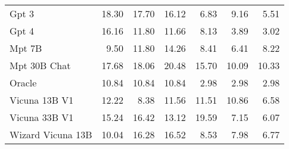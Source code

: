 \begin{table}[!htbp]
\begin{tabular}{l|rrr|rrr}
Gpt 3 & {\cellcolor[HTML]{91017A}} \color[HTML]{F1F1F1} 18.30 & {\cellcolor[HTML]{A5017D}} \color[HTML]{F1F1F1} 17.70 & {\cellcolor[HTML]{D82E94}} \color[HTML]{F1F1F1} 16.12 & {\cellcolor[HTML]{D0EDE9}} \color[HTML]{000000} 6.83 & {\cellcolor[HTML]{9AD8CA}} \color[HTML]{000000} 9.16 & {\cellcolor[HTML]{E0F3F5}} \color[HTML]{000000} 5.51 \\
Gpt 4 & {\cellcolor[HTML]{D62D93}} \color[HTML]{F1F1F1} 16.16 & {\cellcolor[HTML]{FBBBBD}} \color[HTML]{000000} 11.80 & {\cellcolor[HTML]{FCBFBE}} \color[HTML]{000000} 11.66 & {\cellcolor[HTML]{B4E2D8}} \color[HTML]{000000} 8.13 & {\cellcolor[HTML]{EFF9FB}} \color[HTML]{000000} 3.89 & {\cellcolor[HTML]{F7FCFD}} \color[HTML]{000000} 3.02 \\
Mpt 7B & {\cellcolor[HTML]{FEE6E3}} \color[HTML]{000000} 9.50 & {\cellcolor[HTML]{FBBBBD}} \color[HTML]{000000} 11.80 & {\cellcolor[HTML]{F76EA3}} \color[HTML]{F1F1F1} 14.26 & {\cellcolor[HTML]{ADE0D4}} \color[HTML]{000000} 8.41 & {\cellcolor[HTML]{D5EFED}} \color[HTML]{000000} 6.41 & {\cellcolor[HTML]{B2E2D7}} \color[HTML]{000000} 8.22 \\
Mpt 30B Chat & {\cellcolor[HTML]{A6017D}} \color[HTML]{F1F1F1} 17.68 & {\cellcolor[HTML]{99017B}} \color[HTML]{F1F1F1} 18.06 & {\cellcolor[HTML]{49006A}} \color[HTML]{F1F1F1} 20.48 & {\cellcolor[HTML]{1F8742}} \color[HTML]{F1F1F1} 15.70 & {\cellcolor[HTML]{84CFB9}} \color[HTML]{000000} 10.09 & {\cellcolor[HTML]{7DCCB5}} \color[HTML]{000000} 10.33 \\
Oracle & {\cellcolor[HTML]{FCCFCB}} \color[HTML]{000000} 10.84 & {\cellcolor[HTML]{FCCFCB}} \color[HTML]{000000} 10.84 & {\cellcolor[HTML]{FCCFCB}} \color[HTML]{000000} 10.84 & {\cellcolor[HTML]{F7FCFD}} \color[HTML]{000000} 2.98 & {\cellcolor[HTML]{F7FCFD}} \color[HTML]{000000} 2.98 & {\cellcolor[HTML]{F7FCFD}} \color[HTML]{000000} 2.98 \\
Vicuna 13B V1 & {\cellcolor[HTML]{FBB0BA}} \color[HTML]{000000} 12.22 & {\cellcolor[HTML]{FFF7F3}} \color[HTML]{000000} 8.38 & {\cellcolor[HTML]{FCC1BF}} \color[HTML]{000000} 11.56 & {\cellcolor[HTML]{62C09F}} \color[HTML]{000000} 11.51 & {\cellcolor[HTML]{70C6AC}} \color[HTML]{000000} 10.86 & {\cellcolor[HTML]{D3EEEB}} \color[HTML]{000000} 6.58 \\
Vicuna 33B V1 & {\cellcolor[HTML]{E94B9C}} \color[HTML]{F1F1F1} 15.24 & {\cellcolor[HTML]{CD238F}} \color[HTML]{F1F1F1} 16.42 & {\cellcolor[HTML]{FA97B2}} \color[HTML]{000000} 13.12 & {\cellcolor[HTML]{00441B}} \color[HTML]{F1F1F1} 19.59 & {\cellcolor[HTML]{CCECE6}} \color[HTML]{000000} 7.15 & {\cellcolor[HTML]{D9F1F0}} \color[HTML]{000000} 6.07 \\
Wizard Vicuna 13B & {\cellcolor[HTML]{FDDDDA}} \color[HTML]{000000} 10.04 & {\cellcolor[HTML]{D22891}} \color[HTML]{F1F1F1} 16.28 & {\cellcolor[HTML]{CA208D}} \color[HTML]{F1F1F1} 16.52 & {\cellcolor[HTML]{AADFD3}} \color[HTML]{000000} 8.53 & {\cellcolor[HTML]{B8E4DB}} \color[HTML]{000000} 7.98 & {\cellcolor[HTML]{D1EEE9}} \color[HTML]{000000} 6.77 \\

\bottomrule
\end{tabular}
            
\end{table}

